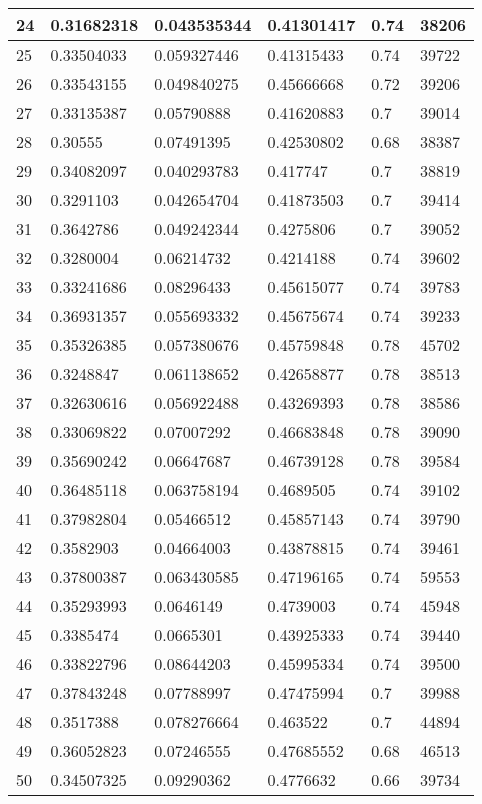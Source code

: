 \begin{longtable}{|l|l|l|l|l|l|}
24 & 0.31682318 & 0.043535344 & 0.41301417 & 0.74 & 38206 \\ \hline 
25 & 0.33504033 & 0.059327446 & 0.41315433 & 0.74 & 39722 \\ \hline 
26 & 0.33543155 & 0.049840275 & 0.45666668 & 0.72 & 39206 \\ \hline 
27 & 0.33135387 & 0.05790888 & 0.41620883 & 0.7 & 39014 \\ \hline 
28 & 0.30555 & 0.07491395 & 0.42530802 & 0.68 & 38387 \\ \hline 
29 & 0.34082097 & 0.040293783 & 0.417747 & 0.7 & 38819 \\ \hline 
30 & 0.3291103 & 0.042654704 & 0.41873503 & 0.7 & 39414 \\ \hline 
31 & 0.3642786 & 0.049242344 & 0.4275806 & 0.7 & 39052 \\ \hline 
32 & 0.3280004 & 0.06214732 & 0.4214188 & 0.74 & 39602 \\ \hline 
33 & 0.33241686 & 0.08296433 & 0.45615077 & 0.74 & 39783 \\ \hline 
34 & 0.36931357 & 0.055693332 & 0.45675674 & 0.74 & 39233 \\ \hline 
35 & 0.35326385 & 0.057380676 & 0.45759848 & 0.78 & 45702 \\ \hline 
36 & 0.3248847 & 0.061138652 & 0.42658877 & 0.78 & 38513 \\ \hline 
37 & 0.32630616 & 0.056922488 & 0.43269393 & 0.78 & 38586 \\ \hline 
38 & 0.33069822 & 0.07007292 & 0.46683848 & 0.78 & 39090 \\ \hline 
39 & 0.35690242 & 0.06647687 & 0.46739128 & 0.78 & 39584 \\ \hline 
40 & 0.36485118 & 0.063758194 & 0.4689505 & 0.74 & 39102 \\ \hline 
41 & 0.37982804 & 0.05466512 & 0.45857143 & 0.74 & 39790 \\ \hline 
42 & 0.3582903 & 0.04664003 & 0.43878815 & 0.74 & 39461 \\ \hline 
43 & 0.37800387 & 0.063430585 & 0.47196165 & 0.74 & 59553 \\ \hline 
44 & 0.35293993 & 0.0646149 & 0.4739003 & 0.74 & 45948 \\ \hline 
45 & 0.3385474 & 0.0665301 & 0.43925333 & 0.74 & 39440 \\ \hline 
46 & 0.33822796 & 0.08644203 & 0.45995334 & 0.74 & 39500 \\ \hline 
47 & 0.37843248 & 0.07788997 & 0.47475994 & 0.7 & 39988 \\ \hline 
48 & 0.3517388 & 0.078276664 & 0.463522 & 0.7 & 44894 \\ \hline 
49 & 0.36052823 & 0.07246555 & 0.47685552 & 0.68 & 46513 \\ \hline 
50 & 0.34507325 & 0.09290362 & 0.4776632 & 0.66 & 39734 \\ \hline 
\end{longtable}